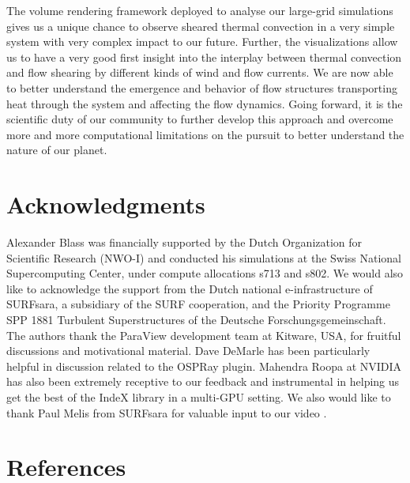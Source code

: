 \documentclass[5p,times]{elsarticle}
\begin{document}
The volume rendering framework deployed to analyse our large-grid simulations gives us a unique chance to observe sheared thermal convection in a very simple system with very complex impact to our future. Further, the visualizations allow us to have a very good first insight into the interplay between thermal convection and flow shearing by different kinds of wind and flow currents. We are now able to better understand the emergence and behavior of flow structures transporting heat through the system and affecting the flow dynamics. Going forward, it is the scientific duty of our community to further develop this approach and overcome more and more computational limitations on the pursuit to better understand the nature of our planet.




\section*{Acknowledgments}

Alexander Blass was financially supported by the Dutch Organization for Scientific Research (NWO-I) and conducted his simulations at the Swiss National Supercomputing Center, under compute allocations s713 and s802. We would also like to acknowledge the support from the Dutch national e-infrastructure of SURFsara, a subsidiary of the SURF cooperation, and the Priority Programme SPP 1881 Turbulent Superstructures of the Deutsche Forschungsgemeinschaft. The authors thank the ParaView development team at Kitware, USA, for fruitful discussions and motivational material. Dave DeMarle has been particularly helpful in discussion related to the OSPRay plugin. Mahendra Roopa at NVIDIA has also been extremely receptive to our feedback and instrumental in helping us get the best of the IndeX library in a multi-GPU setting. We also would like to thank Paul Melis from SURFsara for valuable input to our video \cite{fav18}. 

\section*{References}
 

\end{document}
